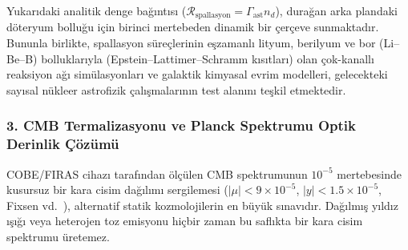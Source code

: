 \begin{remark}
    \label{rem:doteryum_spallasyon}
    Yukarıdaki analitik denge bağıntısı ($\mathcal{R}_{\mathrm{spallasyon}} = \Gamma_{\mathrm{ast}} n_d$), durağan arka plandaki döteryum bolluğu için birinci mertebeden dinamik bir çerçeve sunmaktadır. Bununla birlikte, spallasyon süreçlerinin eşzamanlı lityum, berilyum ve bor (Li--Be--B) bolluklarıyla (Epstein--Lattimer--Schramm kısıtları) olan çok-kanallı reaksiyon ağı simülasyonları ve galaktik kimyasal evrim modelleri, gelecekteki sayısal nükleer astrofizik çalışmalarının test alanını teşkil etmektedir.
\end{remark}

\subsubsection{3. CMB Termalizasyonu ve Planck Spektrumu Optik Derinlik Çözümü}
\label{sec:termalizasyon_cozumu}
COBE/FIRAS cihazı tarafından ölçülen CMB spektrumunun $10^{-5}$ mertebesinde kusursuz bir kara cisim dağılımı sergilemesi ($|\mu| < 9 \times 10^{-5}$, $|y| < 1.5 \times 10^{-5}$, Fixsen vd.~\cite{fixsen1996}), alternatif statik kozmolojilerin en büyük sınavıdır. Dağılmış yıldız ışığı veya heterojen toz emisyonu hiçbir zaman bu saflıkta bir kara cisim spektrumu üretemez.

